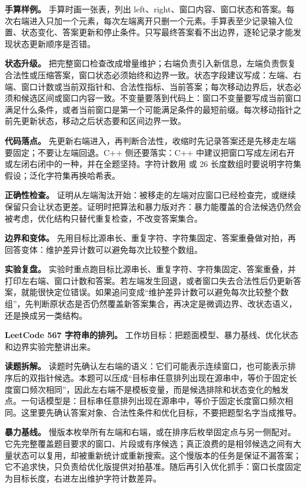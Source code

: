 \textbf{手算样例。} 手算时画一张表，列出 left、right、窗口内容、窗口状态和答案。每次右端进入只加一个元素，每次左端离开只删一个元素。手算表至少记录输入位置、状态变化、答案更新和停止条件。只写最终答案看不出边界，逐轮记录才能发现状态更新顺序是否错。

\textbf{状态升级。} 把完整窗口检查改成增量维护；右端负责引入新信息，左端负责恢复合法性或压缩答案，窗口状态必须始终和边界一致。状态字段建议写成：左端、右端、窗口计数或当前双指针和、合法性指标、当前答案；每次移动边界后，状态必须和候选区间或窗口内容一致。不变量要落到代码上：窗口不变量要写成当前窗口满足什么条件，或者当前窗口是第一个可能满足条件的最短前缀。每次移动指针之前先更新状态，移动之后状态要和区间边界一致。

\textbf{代码落点。} 先更新右端进入，再判断合法性，收缩时先记录答案还是先移走左端要固定；不要让左端回退。C++ 侧还要落实：C++ 中建议把窗口写成左闭右开或左闭右闭中的一种，并在全题坚持。字符计数用  或 26 长度数组时要说明字符集假设；泛化字符集再换哈希表。

\textbf{正确性检查。} 证明从左端淘汰开始：被移走的左端对应窗口已经检查完，或继续保留只会让状态更差。证明时把算法和暴力版对齐：暴力能覆盖的合法候选仍然会被考虑，优化结构只替代重复检查，不改变答案集合。

\textbf{边界和变体。} 先用目标比源串长、重复字符、字符集固定、答案重叠做对拍，再回答变体：维护差异计数可以避免每次比较整个数组。

\textbf{实验复盘。} 实验时重点跑目标比源串长、重复字符、字符集固定、答案重叠，并打印左右端、窗口计数和答案。若左端发生回退，或者窗口失去合法性后仍更新答案，就能很快定位错误。如果追问变成“维护差异计数可以避免每次比较整个数组”，先判断原状态是否仍然覆盖新答案集合，再决定是微调边界、改状态语义，还是换成另一类结构。

\noindent\textbf{LeetCode 567 字符串的排列。} 工作坊目标：把题面模型、暴力基线、优化状态和边界实验完整讲出来。

\textbf{读题拆解。} 读题时先确认左右端的语义：它们可能表示连续窗口，也可能表示排序后的双指针候选。本题可以压成“目标串任意排列出现在源串中，等价于固定长度窗口频次相同”，因此左右端不是模板变量，而是候选排除和状态变化的触发点。一句话模型是：目标串任意排列出现在源串中，等价于固定长度窗口频次相同。这里要先确认答案对象、合法性条件和优化目标，不要把题型名字当成推导。

\textbf{暴力基线。} 慢版本枚举所有左端和右端，或在排序后枚举固定点与另一侧配对。它先完整覆盖题目要求的窗口、片段或有序候选；真正浪费的是相邻候选之间有大量状态可以复用，却被重新统计或重新搜索。这个慢版本的任务是保证不漏答案；它不追求快，只负责给优化版提供对拍基准。随后再引入优化抓手：窗口长度固定为目标长度，右进左出维护字符计数差异。

